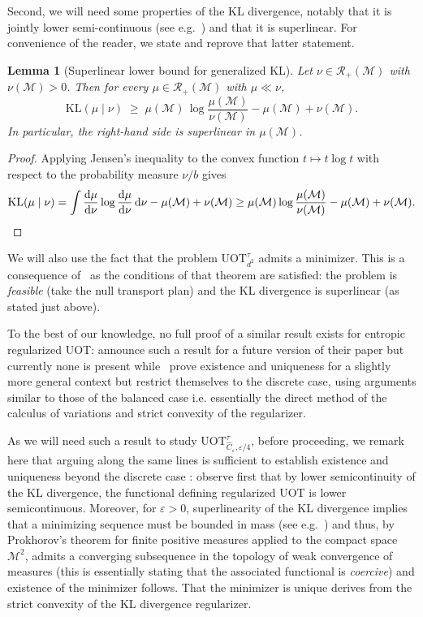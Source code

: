 \documentclass{article}
\theoremstyle{plain}
\newtheorem{lemma}[theorem]{Lemma}
\theoremstyle{definition}
\theoremstyle{remark}
\newcommand{\M}{\ensuremath{\mathcal{M}}}
\begin{document}
Second, we will need some properties of the KL divergence, notably that it is jointly lower semi-continuous (see e.g.~\cite[Theorem 1]{posner2003random}) and that it is superlinear. For convenience of the reader, we state and reprove that latter statement.

\begin{lemma}[Superlinear lower bound for generalized KL]\label{lem:kl-mass}
Let $\nu \in \mathcal{R}_{+}(\M)$ with $\nu(\M) > 0$. Then for every $\mu \in \mathcal{R}_{+}(\M)$ with $\mu \ll \nu$,
\[
\mathrm{KL}(\mu \mid \nu) \;\geq\; \mu(\M)\,\log\frac{\mu(\M)}{\nu(\M)} - \mu(\M) + \nu(\M).
\]
In particular, the right-hand side is superlinear in $\mu(\M)$.
\end{lemma}

\begin{proof}
Applying Jensen's inequality to the convex function $t \mapsto t \log t$ with respect to the probability measure $\nu / b$ gives
\[
\mathrm{KL}(\mu \mid \nu) 
= \int \frac{\mathrm{d}\mu}{\mathrm{d}\nu} \log \frac{\mathrm{d}\mu}{\mathrm{d}\nu}\, \mathrm{d}\nu - \mu(\M) + \nu(\M)
\geq  \mu(\M) \log \frac{ \mu(\M)}{\nu(\M)} - \mu(\M) + \nu(\M). \qedhere
\]
\end{proof}

We will also use the fact that the problem $\mathrm{UOT}_{d^2}^{\tau}$ admits a minimizer. This is a consequence of~\cite[Theorem 3.3]{liero2018optimal} as the conditions of that theorem are satisfied: the problem is \emph{feasible} (take the null transport plan) and the KL divergence is superlinear (as stated just above). 

To the best of our knowledge, no full proof of a similar result exists for entropic regularized UOT: \cite[Theorem 3.3]{buze2023entropic} announce such a result for a future version of their paper but currently none is present while~\cite[Proposition 2.3]{nenna2025convergence} prove existence and uniqueness for a slightly more general context but restrict themselves to the discrete case, using arguments similar to those of the balanced case i.e. essentially the direct method of the calculus of variations and strict convexity of the regularizer.

As we will need such a result to study $\mathrm{UOT}^{\tau}_{\widehat C_{\varepsilon}, \varepsilon/4}$, before proceeding, we remark here that arguing along the same lines is sufficient to establish existence and uniqueness beyond the discrete case : observe first that by lower semicontinuity of the KL divergence, the functional defining regularized UOT is lower semicontinuous. Moreover, for $\varepsilon > 0$, superlinearity of the KL divergence implies that a minimizing sequence must be bounded in mass (see e.g.~\cite[Estimate 3.10]{liero2018optimal}) and thus, by Prokhorov's theorem for finite positive measures applied to the compact space $\M^2$, admits a converging subsequence in the topology of weak convergence of measures (this is essentially stating that the associated functional is \emph{coercive}) and existence of the minimizer follows. That the minimizer is unique derives from the strict convexity of the KL divergence regularizer. 
\end{document}
